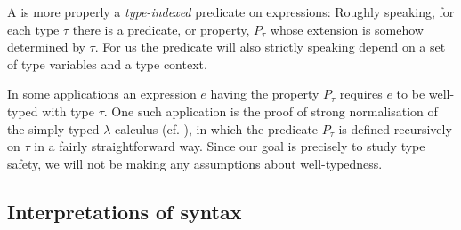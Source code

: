     





A  is more properly a \emph{type-indexed} predicate on expressions: Roughly speaking, for each type $\tau$ there is a predicate, or property, $P_\tau$ whose extension is somehow determined by $\tau$. For us the predicate will also strictly speaking depend on a set of type variables and a type context.

In some applications an expression $e$ having the property $P_\tau$ requires $e$ to be well-typed with type $\tau$. One such application is the proof of strong normalisation of the simply typed $\lambda$-calculus (cf. \cite[§12.1]{pierce-types}), in which the predicate $P_\tau$ is defined recursively on $\tau$ in a fairly straightforward way. Since our goal is precisely to study type safety, we will not be making any assumptions about well-typedness.


\subsection{Interpretations of syntax}\label{sec:interpretations-of-syntax-predicates}

